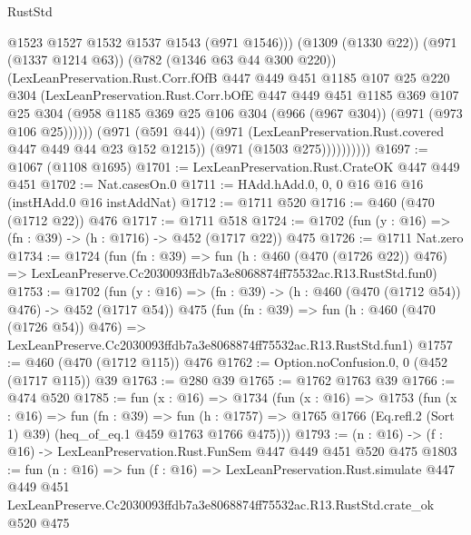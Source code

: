 \begin{lexlean}{RustStd}
\begin{coremodule}
                          @1523
                          @1527
                          @1532
                          @1537
                          @1543
                          (@971 @1546)))
                      (@1309 (@1330 @22))
                      (@971 (@1337 @1214 @63))
                      (@782 (@1346 @63 @44 @300 @220))
                      (LexLeanPreservation.Rust.Corr.fOfB
                        @447
                        @449
                        @451
                        @1185
                        @107
                        @25
                        @220
                        @304
                        (LexLeanPreservation.Rust.Corr.bOfE
                          @447
                          @449
                          @451
                          @1185
                          @369
                          @107
                          @25
                          @304
                          (@958
                            @1185
                            @369
                            @25
                            @106
                            @304
                            (@966 (@967 @304))
                            (@971 (@973 @106 @25))))))
                    (@971 (@591 @44))
                    (@971 (LexLeanPreservation.Rust.covered @447 @449 @44 @23 @152 @1215))
                    (@971 (@1503 @275))))))))))
@1697 := @1067 (@1108 @1695)
@1701 := LexLeanPreservation.Rust.CrateOK @447 @449 @451
@1702 := Nat.casesOn.{0}
@1711 := HAdd.hAdd.{0, 0, 0} @16 @16 @16 (instHAdd.{0} @16 instAddNat)
@1712 := @1711 @520
@1716 := @460 (@470 (@1712 @22)) @476
@1717 := @1711 @518
@1724 := @1702 (fun (y : @16) => (fn : @39) -> (h : @1716) -> @452 (@1717 @22)) @475
@1726 := @1711 Nat.zero
@1734 := @1724
    (fun (fn : @39) =>
    fun (h : @460 (@470 (@1726 @22)) @476) =>
    LexLeanPreserve.Cc2030093ffdb7a3e8068874ff75532ac.R13.RustStd.fun0)
@1753 := @1702
    (fun (y : @16) => (fn : @39) -> (h : @460 (@470 (@1712 @54)) @476) -> @452 (@1717 @54))
    @475
    (fun (fn : @39) =>
    fun (h : @460 (@470 (@1726 @54)) @476) =>
    LexLeanPreserve.Cc2030093ffdb7a3e8068874ff75532ac.R13.RustStd.fun1)
@1757 := @460 (@470 (@1712 @115)) @476
@1762 := Option.noConfusion.{0, 0} (@452 (@1717 @115)) @39
@1763 := @280 @39
@1765 := @1762 @1763 @39
@1766 := @474 @520
@1785 := fun (x : @16) =>
  @1734
    (fun (x : @16) =>
    @1753
      (fun (x : @16) =>
      fun (fn : @39) =>
      fun (h : @1757) =>
      @1765 @1766 (Eq.refl.{2} (Sort 1) @39) (heq_of_eq.{1} @459 @1763 @1766 @475)))
@1793 := (n : @16) -> (f : @16) -> LexLeanPreservation.Rust.FunSem @447 @449 @451 @520 @475
@1803 := fun (n : @16) =>
  fun (f : @16) =>
  LexLeanPreservation.Rust.simulate
    @447
    @449
    @451
    LexLeanPreserve.Cc2030093ffdb7a3e8068874ff75532ac.R13.RustStd.crate_ok
    @520
    @475
\end{coremodule}
\end{lexlean}
